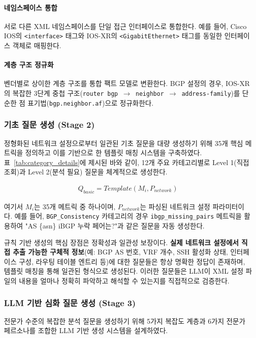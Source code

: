 \documentclass[twocolumn, 10pt]{article}
\newcommand{\subsubsubsection}[1]{\paragraph{#1}}%
\renewcommand{\subsubsubsection}[1]{\paragraph{#1}}%
\begin{document}
\subsubsubsection{네임스페이스 통합} 서로 다른 XML 네임스페이스를 단일 접근
인터페이스로 통합한다. 예를 들어, Cisco IOS의 \texttt{<interface>} 태그와 IOS-XR의
\texttt{<GigabitEthernet>} 태그를 동일한 인터페이스 객체로 매핑한다.

\subsubsubsection{계층 구조 정규화} 벤더별로 상이한 계층 구조를 통합 팩트 모델로
변환한다. BGP 설정의 경우, IOS-XR의 복잡한 3단계 중첩 구조(\texttt{router bgp
$\rightarrow$ neighbor $\rightarrow$ address-family})를 단순한 점 표기법(\texttt{bgp.neighbor.af})으로
정규화한다.

\subsubsection{기초 질문 생성 (Stage 2)}

정형화된 네트워크 설정으로부터 일관된 기초 질문을 대량 생성하기 위해 35개 핵심
메트릭을 정의하고 이를 기반으로 한 템플릿 매칭 시스템을 구축하였다. 표~\ref{tab:category_details}에
제시된 바와 같이, 12개 주요 카테고리별로 Level 1(직접 조회)과 Level 2(분석 필요)
질문을 체계적으로 생성한다.

\begin{align}
Q_{basic}= Template(M_{i}, P_{network}) \label{eq:rule_based}
\end{align}

여기서 $M_{i}$는 35개 메트릭 중 하나이며, $P_{network}$는 파싱된 네트워크 설정
파라미터이다. 예를 들어, \texttt{BGP\_Consistency} 카테고리의 경우 \texttt{ibgp\_missing\_pairs}
메트릭을 활용하여 "AS \{asn\} iBGP 누락 페어는?"과 같은 질문을 자동 생성한다.

규칙 기반 생성의 핵심 장점은 정확성과 일관성 보장이다. \textbf{실제 네트워크
설정에서 직접 추출 가능한 구체적 정보}(예: BGP AS 번호, VRF 개수, SSH 활성화 상태,
인터페이스 구성, 라우팅 테이블 엔트리 등)에 대한 질문들은 항상 명확한 정답이 존재하며,
템플릿 매칭을 통해 일관된 형식으로 생성된다. 이러한 질문들은 LLM이 XML 설정 파일의
내용을 얼마나 정확히 파악하고 해석할 수 있는지를 직접적으로 검증한다.

\subsubsection{LLM 기반 심화 질문 생성 (Stage 3)}

전문가 수준의 복잡한 분석 질문을 생성하기 위해 5가지 복잡도 계층과 6가지
전문가 페르소나를 조합한 LLM 기반 생성 시스템을 설계하였다.
\end{document}
